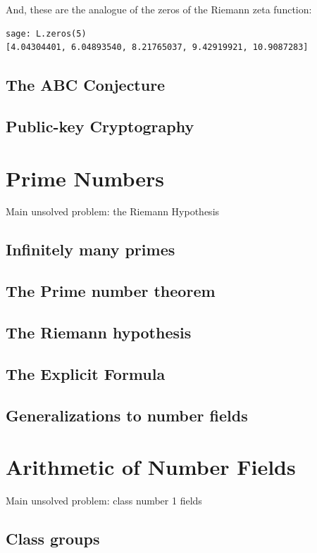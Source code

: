 \documentclass{book}
\begin{document}
And, these are the analogue of the zeros of the Riemann zeta function:
\begin{lstlisting}
sage: L.zeros(5)
[4.04304401, 6.04893540, 8.21765037, 9.42919921, 10.9087283]
\end{lstlisting}


\section{The ABC Conjecture}




\section{Public-key Cryptography}





\chapter{Prime Numbers}

Main unsolved problem: the Riemann Hypothesis



\section{Infinitely many primes}
\section{The Prime number theorem}
\section{The Riemann hypothesis}
\section{The Explicit Formula}
\section{Generalizations to number fields}


\chapter{Arithmetic of Number Fields}
Main unsolved problem: class number 1 fields

\section{Class groups}
\end{document}
